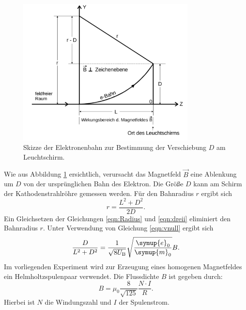 \begin{figure}
  \centering
  \includegraphics[width=0.8\textwidth]{Messdaten/ablenkungbfeld.png}
  \caption{Skizze der Elektronenbahn zur Bestimmung der Verschiebung $D$ am Leuchtschirm.}
  \label{fig:D}
\end{figure}
Wie aus Abbildung \ref{fig:D} ersichtlich, verursacht das Magnetfeld $\vec{B}$ eine Ablenkung um $D$ von der ursprünglichen Bahn des Elektron.
Die Größe $D$ kann am Schirm der Kathodenstrahlröhre gemessen werden.
Für den Bahnradius $r$ ergibt sich
\begin{equation}
  \label{eqn:dreii}
	r=\frac{L^2+D^2}{2D} \mathrm{.}
\end{equation}
Ein Gleichsetzen der Gleichungen \eqref{eqn:Radius} und \eqref{eqn:dreii} eliminiert den Bahnradius $r$. Unter Verwendung von Gleichung \eqref{eqn:vnull} ergibt sich
\begin{equation}
  \label{eqn:bfeld1}
  \frac{D}{L^2+D^2}=\frac{1}{\sqrt{8U_\mathrm{B}}}\sqrt{\frac{\symup{e}_0}{\symup{m}_0}}B \text{.}
\end{equation}
Im vorliegenden Experiment wird zur Erzeugung eines homogenen Magnetfeldes ein Helmholtzspulenpaar verwendet.
Die Flussdichte $B$ ist gegeben durch:
\begin{equation}
  \label{eqn:b-feld}
  B=\mu_0\frac{8}{\sqrt{125}}\frac{N\cdot I}{R} \text{.}
\end{equation}
Hierbei ist $N$ die Windungszahl und $I$ der Spulenstrom.
